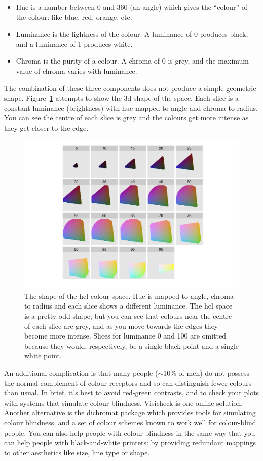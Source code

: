 \begin{itemize}
  \item Hue is a number between 0 and 360 (an angle) which gives the ``colour'' of the colour: like blue, red, orange, etc.
  \item Luminance is the lightness of the colour.  A luminance of 0 produces black, and a luminance of 1 produces white.
  \item Chroma is the purity of a colour.  A chroma of 0 is grey, and the maximum value of chroma varies with luminance.
\end{itemize} 

The combination of these three components does not produce a simple geometric shape.  Figure~\ref{fig:hcl} attempts to show the 3d shape of the space.  Each slice is a constant luminance (brightness) with hue mapped to angle and chroma to radius.  You can see the centre of each slice is grey and the colours get more intense as they get closer to the edge.

\begin{figure}[htbp]
  \centering
    \includegraphics[width=\linewidth]{hcl-space}
  \caption{The shape of the hcl colour space.  Hue is mapped to angle, chroma to radius and each slice shows a different luminance.  The hcl space is a pretty odd shape, but you can see that colours near the centre of each slice are grey, and as you move towards the edges they become more intense.  Slices for luminance 0 and 100 are omitted because they would, respectively, be a single black point and a single white point.}
  \label{fig:hcl}
\end{figure}

An additional complication is that many people ($\sim$10\% of men) do not possess the normal complement of colour receptors and so can distinguish fewer colours than usual. In brief, it's best to avoid red-green contrasts, and to check your plots with systems that simulate colour blindness. Visicheck is one online solution. Another alternative is the dichromat package \citep{dichromat} which provides tools for simulating colour blindness, and a set of colour schemes known to work well for colour-blind people. You can also help people with colour blindness in the same way that you can help people with black-and-white printers: by providing redundant mappings to other aesthetics like size, line type or shape.

